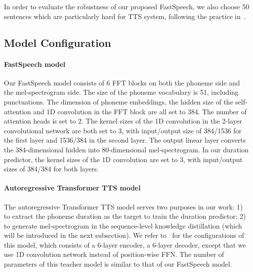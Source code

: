 \documentclass{article}
\begin{document}
In order to evaluate the robustness of our proposed FastSpeech, we also choose 50 sentences which are particularly hard for TTS system, following the practice in~\citep{ping2018deep}.


\subsection{Model Configuration}

\paragraph{FastSpeech model}
Our FastSpeech model consists of 6 FFT blocks on both the phoneme side and the mel-spectrogram side. The size of the phoneme vocabulary is 51, including punctuations. The dimension of phoneme embeddings, the hidden size of the self-attention and 1D convolution in the FFT block are all set to 384. The number of attention heads is set to 2. The kernel sizes of the 1D convolution in the 2-layer convolutional network are both set to 3, with input/output size of 384/1536 for the first layer and 1536/384 in the second layer. The output linear layer converts the 384-dimensional hidden into 80-dimensional mel-spectrogram. In our duration predictor, the kernel sizes of the 1D convolution are set to 3, with input/output sizes of 384/384 for both layers.


\paragraph{Autoregressive Transformer TTS model}
The autoregressive Transformer TTS model serves two purposes in our work: 1) to extract the phoneme duration as the target to train the duration predictor; 2) to generate mel-spectrogram in the sequence-level knowledge distillation (which will be introduced in the next subsection). We refer to~\citep{li2018close} for the configurations of this model, which consists of a 6-layer encoder, a 6-layer decoder, except that we use 1D convolution network instead of position-wise FFN. The number of parameters of this teacher model is similar to that of our FastSpeech model. 
\end{document}

